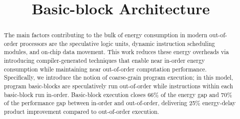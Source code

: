 \documentclass[pageno]{jpaper}
\begin{document}
\title{
Basic-block Architecture}

\date{}
\maketitle


\begin{abstract}

The main factors contributing to the bulk of energy consumption in modern
out-of-order processors are the speculative logic units, dynamic instruction
scheduling modules, and on-chip data movement.  This work reduces these energy
overheads via introducing compiler-generated techniques that enable near
in-order energy consumption while maintaining near out-of-order computation
performance. Specifically, we introduce the notion of coarse-grain program
execution; in this model, program basic-blocks are speculatively run
out-of-order while instructions within each basic-block run in-order.
Basic-block execution closes 66\% of the energy gap and 70\% of the performance
gap between in-order and out-of-order, delivering 25\% energy-delay product
improvement compared to out-of-order execution.

\end{abstract}










%

\clearpage
{}


\end{document}
